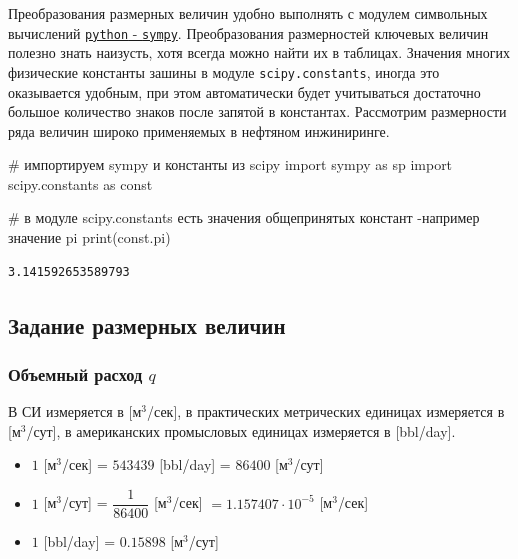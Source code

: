 \documentclass[
  russian,
  letterpaper,
  DIV=11,
  numbers=noendperiod,
  oneside]{scrartcl}
\newenvironment{Shaded}{\begin{snugshade}}{\end{snugshade}}
\newcommand{\BuiltInTok}[1]{\textcolor[rgb]{0.00,0.23,0.31}{#1}}
\newcommand{\CommentTok}[1]{\textcolor[rgb]{0.37,0.37,0.37}{#1}}
\newcommand{\ImportTok}[1]{\textcolor[rgb]{0.00,0.46,0.62}{#1}}
\newcommand{\NormalTok}[1]{\textcolor[rgb]{0.00,0.23,0.31}{#1}}
\providecommand{\tightlist}{%
  \setlength{\itemsep}{0pt}\setlength{\parskip}{0pt}}
\begin{document}
Преобразования размерных величин удобно выполнять с модулем символьных
вычислений \href{https://www.sympy.org/}{\texttt{python} -
\texttt{sympy}}. Преобразования размерностей ключевых величин полезно
знать наизусть, хотя всегда можно найти их в таблицах. Значения многих
физические константы зашины в модуле \texttt{scipy.constants}, иногда
это оказывается удобным, при этом автоматически будет учитываться
достаточно большое количество знаков после запятой в константах.
Рассмотрим размерности ряда величин широко применяемых в нефтяном
инжиниринге.

\begin{Shaded}
\begin{Highlighting}[]
\CommentTok{\# импортируем sympy и константы из scipy}
\ImportTok{import}\NormalTok{ sympy }\ImportTok{as}\NormalTok{ sp}
\ImportTok{import}\NormalTok{ scipy.constants }\ImportTok{as}\NormalTok{ const}

\CommentTok{\# в модуле scipy.constants есть значения общепринятых констант {-}например значение pi}
\BuiltInTok{print}\NormalTok{(const.pi)}
\end{Highlighting}
\end{Shaded}

\begin{verbatim}
3.141592653589793
\end{verbatim}

\subsection{Задание размерных
величин}\label{ux437ux430ux434ux430ux43dux438ux435-ux440ux430ux437ux43cux435ux440ux43dux44bux445-ux432ux435ux43bux438ux447ux438ux43d}

\subsubsection{\texorpdfstring{Объемный расход
\(q\)}{Объемный расход q}}\label{ux43eux431ux44aux435ux43cux43dux44bux439-ux440ux430ux441ux445ux43eux434-q}

В СИ измеряется в {[}м\(^3\)/сек{]}, в практических метрических единицах
измеряется в {[}м\(^3\)/сут{]}, в американских промысловых единицах
измеряется в {[}bbl/day{]}.

\begin{itemize}
\tightlist
\item
  \(1\) {[}м\(^3\)/сек{]} = \(543439\) {[}bbl/day{]} = \(86400\)
  {[}м\(^3\)/сут{]}
\item
  \(1\) {[}м\(^3\)/сут{]} = \(\dfrac{1}{86400}\) {[}м\(^3\)/сек{]}
  \(= 1.157407 \cdot 10^{-5}\) {[}м\(^3\)/сек{]}
\item
  \(1\) {[}bbl/day{]} = \(0.15898\) {[}м\(^3\)/сут{]}
\end{itemize}
\end{document}
